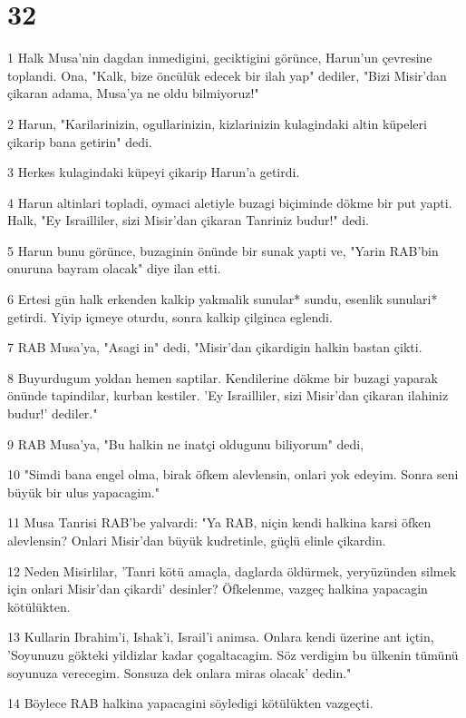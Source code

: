 \chapter{32}

\par 1 Halk Musa'nin dagdan inmedigini, geciktigini görünce, Harun'un çevresine toplandi. Ona, "Kalk, bize öncülük edecek bir ilah yap" dediler, "Bizi Misir'dan çikaran adama, Musa'ya ne oldu bilmiyoruz!"
\par 2 Harun, "Karilarinizin, ogullarinizin, kizlarinizin kulagindaki altin küpeleri çikarip bana getirin" dedi.
\par 3 Herkes kulagindaki küpeyi çikarip Harun'a getirdi.
\par 4 Harun altinlari topladi, oymaci aletiyle buzagi biçiminde dökme bir put yapti. Halk, "Ey Israilliler, sizi Misir'dan çikaran Tanriniz budur!" dedi.
\par 5 Harun bunu görünce, buzaginin önünde bir sunak yapti ve, "Yarin RAB'bin onuruna bayram olacak" diye ilan etti.
\par 6 Ertesi gün halk erkenden kalkip yakmalik sunular* sundu, esenlik sunulari* getirdi. Yiyip içmeye oturdu, sonra kalkip çilginca eglendi.
\par 7 RAB Musa'ya, "Asagi in" dedi, "Misir'dan çikardigin halkin bastan çikti.
\par 8 Buyurdugum yoldan hemen saptilar. Kendilerine dökme bir buzagi yaparak önünde tapindilar, kurban kestiler. 'Ey Israilliler, sizi Misir'dan çikaran ilahiniz budur!' dediler."
\par 9 RAB Musa'ya, "Bu halkin ne inatçi oldugunu biliyorum" dedi,
\par 10 "Simdi bana engel olma, birak öfkem alevlensin, onlari yok edeyim. Sonra seni büyük bir ulus yapacagim."
\par 11 Musa Tanrisi RAB'be yalvardi: "Ya RAB, niçin kendi halkina karsi öfken alevlensin? Onlari Misir'dan büyük kudretinle, güçlü elinle çikardin.
\par 12 Neden Misirlilar, 'Tanri kötü amaçla, daglarda öldürmek, yeryüzünden silmek için onlari Misir'dan çikardi' desinler? Öfkelenme, vazgeç halkina yapacagin kötülükten.
\par 13 Kullarin Ibrahim'i, Ishak'i, Israil'i animsa. Onlara kendi üzerine ant içtin, 'Soyunuzu gökteki yildizlar kadar çogaltacagim. Söz verdigim bu ülkenin tümünü soyunuza verecegim. Sonsuza dek onlara miras olacak' dedin."
\par 14 Böylece RAB halkina yapacagini söyledigi kötülükten vazgeçti.
